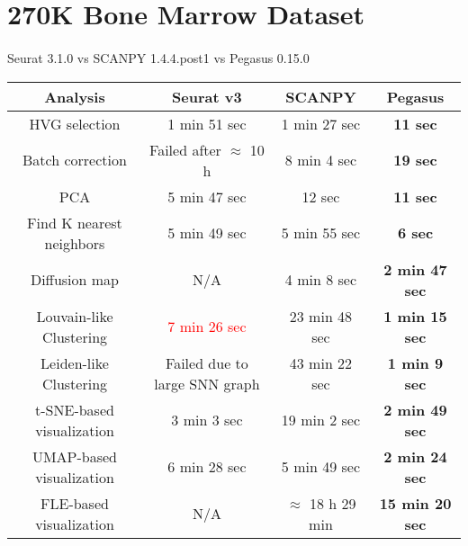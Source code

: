 \documentclass[10pt]{article}
\begin{document}
\section{270K Bone Marrow Dataset}

\paragraph{}
Seurat 3.1.0 \qquad vs \qquad SCANPY 1.4.4.post1 \qquad vs \qquad Pegasus 0.15.0

\begin{table}[H]
	\centering
	\begin{tabular}{|c|c|c|c|}
		\hline
		Analysis & Seurat v3 & SCANPY & Pegasus\\
		\hline \hline
		HVG selection & 1 min 51 sec & 1 min 27 sec & \textbf{11 sec} \\
		\hline
		Batch correction & Failed after $\approx$ 10 h & 8 min 4 sec & \textbf{19 sec} \\
		\hline
		PCA & 5 min 47 sec & 12 sec & \textbf{11 sec} \\
		\hline
		Find K nearest neighbors &  5 min 49 sec &  5 min 55 sec & \textbf{6 sec}\\
		\hline
		Diffusion map & N/A & 4 min 8 sec & \textbf{2 min 47 sec} \\
		\hline
		Louvain-like Clustering & \textcolor{red}{7 min 26 sec} & 23 min 48 sec & \textbf{1 min 15 sec} \\
		\hline 
		Leiden-like Clustering & Failed due to large SNN graph & 43 min 22 sec & \textbf{1 min 9 sec}\\
		\hline
		t-SNE-based visualization & 3 min 3 sec & 19 min 2 sec & \textbf{2 min 49 sec}\\
		\hline
		UMAP-based visualization & 6 min 28 sec & 5 min 49 sec  & \textbf{2 min 24 sec}\\
		\hline
		FLE-based visualization & N/A & $\approx$ 18 h 29 min & \textbf{15 min 20 sec}\\
		\hline
	\end{tabular}
\end{table}
\end{document}
